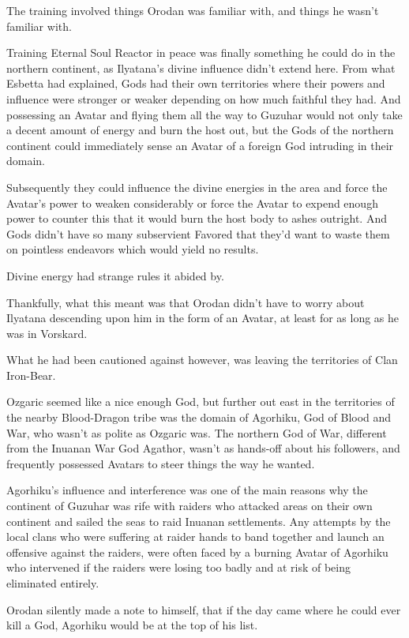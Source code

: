 \documentclass[a4paper,10pt]{book}
\begin{document}
\par
The training involved things Orodan was familiar with, and things he wasn’t familiar with.\par
Training Eternal Soul Reactor in peace was finally something he could do in the northern continent, as Ilyatana’s divine influence didn’t extend here. From what Esbetta had explained, Gods had their own territories where their powers and influence were stronger or weaker depending on how much faithful they had. And possessing an Avatar and flying them all the way to Guzuhar would not only take a decent amount of energy and burn the host out, but the Gods of the northern continent could immediately sense an Avatar of a foreign God intruding in their domain.\par
Subsequently they could influence the divine energies in the area and force the Avatar’s power to weaken considerably or force the Avatar to expend enough power to counter this that it would burn the host body to ashes outright. And Gods didn’t have so many subservient Favored that they’d want to waste them on pointless endeavors which would yield no results.\par
Divine energy had strange rules it abided by.\par
Thankfully, what this meant was that Orodan didn’t have to worry about Ilyatana descending upon him in the form of an Avatar, at least for as long as he was in Vorskard.\par
What he had been cautioned against however, was leaving the territories of Clan Iron-Bear.\par
Ozgaric seemed like a nice enough God, but further out east in the territories of the nearby Blood-Dragon tribe was the domain of Agorhiku, God of Blood and War, who wasn’t as polite as Ozgaric was. The northern God of War, different from the Inuanan War God Agathor, wasn’t as hands-off about his followers, and frequently possessed Avatars to steer things the way he wanted.\par
Agorhiku’s influence and interference was one of the main reasons why the continent of Guzuhar was rife with raiders who attacked areas on their own continent and sailed the seas to raid Inuanan settlements. Any attempts by the local clans who were suffering at raider hands to band together and launch an offensive against the raiders, were often faced by a burning Avatar of Agorhiku who intervened if the raiders were losing too badly and at risk of being eliminated entirely.\par
Orodan silently made a note to himself, that if the day came where he could ever kill a God, Agorhiku would be at the top of his list.\par
\end{document}
